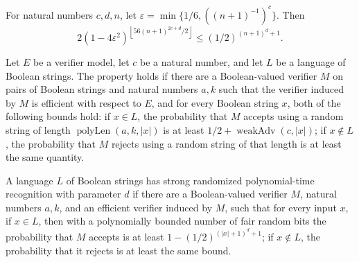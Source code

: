 \begin{theorem}
\label{Randomized.weakAdv_tail_bound}
\leanok
{}
For natural numbers $c,d,n$, let $\varepsilon=\min\{1/6,((n+1)^{-1})^c\}$. Then
\[
2(1-4\varepsilon^2)^{\left\lfloor 56(n+1)^{2c+d}/2\right\rfloor}\le (1/2)^{(n+1)^d+1}.
\]
\end{theorem}

\begin{definition}
\label{Randomized.InBPPWeak}
\leanok
{}
Let $E$ be a verifier model, let $c$ be a natural number, and let $L$ be a language of
Boolean strings. The property holds if there are a Boolean-valued verifier $M$ on pairs
of Boolean strings and natural numbers $a,k$ such that the verifier induced by $M$ is
efficient with respect to $E$, and for every Boolean string $x$, both of the following
bounds hold: if $x\in L$, the probability that $M$ accepts using a random string of
length $\operatorname{polyLen}(a,k,|x|)$ is at least
$1/2+\operatorname{weakAdv}(c,|x|)$; if $x\notin L$, the probability that $M$ rejects
using a random string of that length is at least the same quantity.
\end{definition}

\begin{definition}
\label{Randomized.InBPPStrong}
\leanok
{}
A language $L$ of Boolean strings has strong randomized polynomial-time recognition with
parameter $d$ if there are a Boolean-valued verifier $M$, natural numbers $a,k$, and an
efficient verifier induced by $M$, such that for every input $x$, if $x\in L$, then with
a polynomially bounded number of fair random bits the probability that $M$ accepts is at
least $1-(1/2)^{(|x|+1)^d+1}$; if $x\notin L$, the probability that it rejects is at
least the same bound.
\end{definition}

